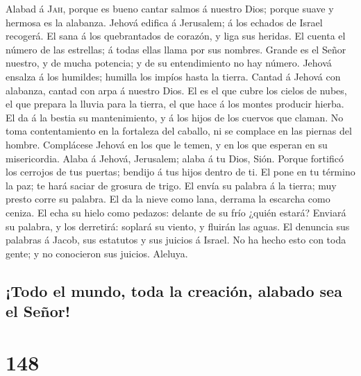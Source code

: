  Alabad á \textsc{Jah}, porque es bueno cantar salmos á
nuestro Dios; porque suave y hermosa es la alabanza. 
Jehová edifica á Jerusalem; á los echados de Israel recogerá.
 El sana á los quebrantados de corazón, y liga sus
heridas.  El cuenta el número de las estrellas; á todas
ellas llama por sus nombres.  Grande es el Señor nuestro,
y de mucha potencia; y de su entendimiento no hay número. 
Jehová ensalza á los humildes; humilla los impíos hasta la tierra.
 Cantad á Jehová con alabanza, cantad con arpa á nuestro
Dios.  El es el que cubre los cielos de nubes, el que
prepara la lluvia para la tierra, el que hace á los montes producir
hierba.  El da á la bestia su mantenimiento, y á los hijos
de los cuervos que claman.  No toma contentamiento en la
fortaleza del caballo, ni se complace en las piernas del hombre.
 Complácese Jehová en los que le temen, y en los que
esperan en su misericordia.  Alaba á Jehová, Jerusalem;
alaba á tu Dios, Sión.  Porque fortificó los cerrojos de
tus puertas; bendijo á tus hijos dentro de ti.  El pone
en tu término la paz; te hará saciar de grosura de trigo.
 El envía su palabra á la tierra; muy presto corre su
palabra.  El da la nieve como lana, derrama la escarcha
como ceniza.  El echa su hielo como pedazos: delante de
su frío ¿quién estará?  Enviará su palabra, y los
derretirá: soplará su viento, y fluirán las aguas.  El
denuncia sus palabras á Jacob, sus estatutos y sus juicios á Israel.
 No ha hecho esto con toda gente; y no conocieron sus
juicios. Aleluya.

\hypertarget{todo-el-mundo-toda-la-creaciuxf3n-alabado-sea-el-seuxf1or}{%
\subsection{¡Todo el mundo, toda la creación, alabado sea el
Señor!}\label{todo-el-mundo-toda-la-creaciuxf3n-alabado-sea-el-seuxf1or}}

\hypertarget{section-147}{%
\section{148}\label{section-147}}


